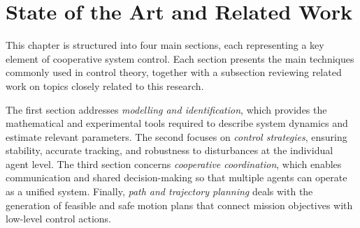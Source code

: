 
\chapter{State of the Art and Related Work}
\label{chapter:state_of_the_art}

This chapter is structured into four main sections, each representing a key element of cooperative system control. Each section presents the main techniques commonly used in control theory, together with a subsection reviewing related work on topics closely related to this research.

The first section addresses \textit{modelling and identification}, which provides the mathematical and experimental tools required to describe system dynamics and estimate relevant parameters. The second focuses on \textit{control strategies}, ensuring stability, accurate tracking, and robustness to disturbances at the individual agent level. The third section concerns \textit{cooperative coordination}, which enables communication and shared decision-making so that multiple agents can operate as a unified system. Finally, \textit{path and trajectory planning} deals with the generation of feasible and safe motion plans that connect mission objectives with low-level control actions.




